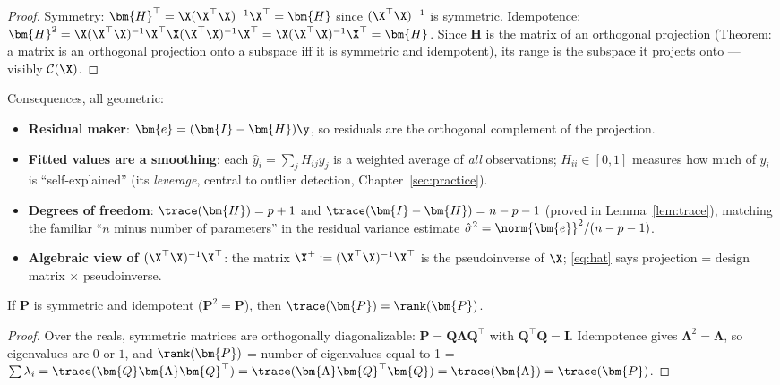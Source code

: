 \begin{proof}
Symmetry: $\bm{H}^\top = \X (\X^\top\X)^{-1} \X^\top = \bm{H}$ since $(\X^\top\X)^{-1}$ is symmetric. Idempotence: $\bm{H}^2 = \X(\X^\top\X)^{-1}\X^\top\X(\X^\top\X)^{-1}\X^\top = \X(\X^\top\X)^{-1}\X^\top = \bm{H}$. Since $\bm{H}$ is the matrix of an orthogonal projection (Theorem: a matrix is an orthogonal projection onto a subspace iff it is symmetric and idempotent), its range is the subspace it projects onto — visibly $\mathcal{C}(\X)$.
\end{proof}

Consequences, all geometric:
\begin{itemize}
  \item \textbf{Residual maker}: $\bm{e} = (\bm{I} - \bm{H})\y$, so residuals are the orthogonal complement of the projection.
  \item \textbf{Fitted values are a smoothing}: each $\hat{y}_i = \sum_j H_{ij} y_j$ is a weighted average of \emph{all} observations; $H_{ii} \in [0,1]$ measures how much of $y_i$ is ``self-explained'' (its \emph{leverage}, central to outlier detection, Chapter~\ref{sec:practice}).
  \item \textbf{Degrees of freedom}: $\trace(\bm{H}) = p+1$ and $\trace(\bm{I}-\bm{H}) = n - p - 1$ (proved in Lemma~\ref{lem:trace}), matching the familiar ``$n$ minus number of parameters'' in the residual variance estimate $\hat{\sigma}^2 = \norm{\bm{e}}^2 / (n-p-1)$.
  \item \textbf{Algebraic view of $(\X^\top\X)^{-1}\X^\top$}: the matrix $\X^+ := (\X^\top\X)^{-1}\X^\top$ is the pseudoinverse of $\X$; \eqref{eq:hat} says projection = design matrix $\times$ pseudoinverse.
\end{itemize}

\begin{lemma}\label{lem:trace}
If $\bm{P}$ is symmetric and idempotent ($\bm{P}^2 = \bm{P}$), then $\trace(\bm{P}) = \rank(\bm{P})$.
\end{lemma}
\begin{proof}
Over the reals, symmetric matrices are orthogonally diagonalizable: $\bm{P} = \bm{Q} \bm{\Lambda} \bm{Q}^\top$ with $\bm{Q}^\top \bm{Q} = \bm{I}$. Idempotence gives $\bm{\Lambda}^2 = \bm{\Lambda}$, so eigenvalues are $0$ or $1$, and $\rank(\bm{P})$ = number of eigenvalues equal to 1 = $\sum \lambda_i = \trace(\bm{Q}\bm{\Lambda}\bm{Q}^\top) = \trace(\bm{\Lambda}\bm{Q}^\top\bm{Q}) = \trace(\bm{\Lambda}) = \trace(\bm{P})$.
\end{proof}

